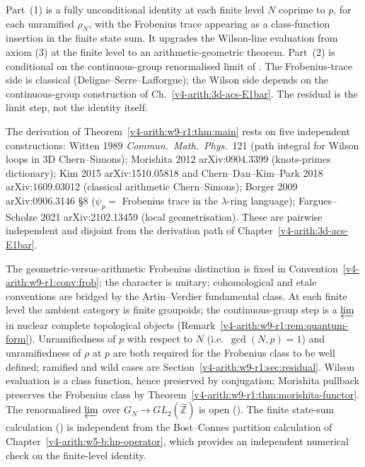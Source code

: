 \begin{remark}
\label{v4-arith:w9-r1:rem:domain}
Part~(1) is a fully unconditional identity at each finite level \(N\)
coprime to \(p\), for each unramified \(\rho_{N}\), with the
Frobenius trace appearing as a class-function insertion in the
finite state sum. It upgrades the Wilson-line evaluation from axiom
(3) at the finite level to an
arithmetic-geometric theorem. Part~(2) is conditional on the
continuous-group renormalised limit of
. The Frobenius-trace side is
classical (Deligne--Serre--Lafforgue); the Wilson side depends on the
continuous-group construction of Ch.~\ref{v4-arith:3d-acs-E1bar}.
The residual is the limit step, not the identity itself.
\end{remark}

\begin{remark}
\label{v4-arith:w9-r1:rem:main-sources}
The derivation of Theorem~\ref{v4-arith:w9-r1:thm:main} rests on
five independent constructions: Witten 1989
\emph{Commun.\ Math.\ Phys.}~121 (path integral for Wilson loops in 3D
Chern--Simons); Morishita 2012 arXiv:0904.3399 (knots-primes dictionary);
Kim 2015 arXiv:1510.05818 and Chern--Dan--Kim--Park 2018
arXiv:1609.03012 (classical arithmetic Chern--Simons); Borger 2009
arXiv:0906.3146 \S8 (\(\psi_{p} =\) Frobenius trace in the
\(\lambda\)-ring language); Fargues--Scholze 2021 arXiv:2102.13459
(local geometrisation). These are pairwise independent and disjoint
from the derivation path of Chapter~\ref{v4-arith:3d-acs-E1bar}.

The geometric-versus-arithmetic Frobenius distinction is fixed in
Convention~\ref{v4-arith:w9-r1:conv:frob}; the character is unitary;
cohomological and etale conventions are bridged by the Artin--Verdier
fundamental class.
At each finite level the ambient category is finite groupoids; the
continuous-group step is a \(\varprojlim\) in nuclear complete topological
objects (Remark~\ref{v4-arith:w9-r1:rem:quantum-form}).
Unramifiedness of \(p\) with respect to \(N\) (i.e.\ \(\gcd(N,p)=1\))
and unramifiedness of \(\rho\) at \(p\) are both required for the
Frobenius class to be well defined; ramified and wild cases are
Section~\ref{v4-arith:w9-r1:sec:residual}.
Wilson evaluation is a class function, hence preserved by conjugation;
Morishita pullback preserves the Frobenius class by
Theorem~\ref{v4-arith:w9-r1:thm:morishita-functor}.
The renormalised \(\varprojlim\) over \(G_{N}\to GL_{2}(\widehat{\mathbb Z})\)
is open ().
The finite state-sum calculation ()
is independent from the Bost--Connes partition calculation of
Chapter~\ref{v4-arith:w5-b:hp-operator}, which provides an independent
numerical check on the finite-level identity.
\end{remark}

